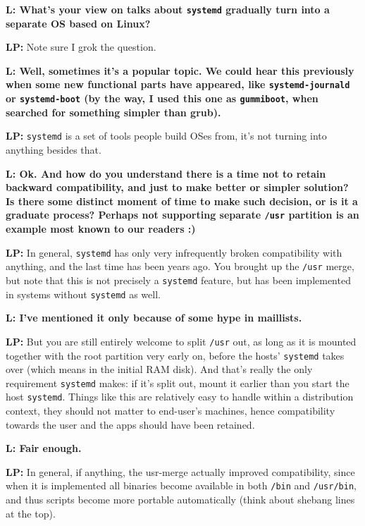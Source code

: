 \documentclass[10pt, a5paper]{article}
\begin{document}
\begin{Parallel}[p]{}{}
{{\noindent \bf L: What's your view on talks about \verb!systemd! gradually turn into a separate OS based on Linux? }

{\noindent \bf LP:}  Note sure I grok the question.

{\noindent \bf L: Well, sometimes it's a popular topic. We could hear this previously when some new functional parts have appeared, like \verb!systemd-journald! or \verb!systemd-boot! (by the way, I used this one as \verb!gummiboot!, when searched for something simpler than grub). }

{\noindent \bf LP:} \verb!systemd! is a set of tools people build OSes from, it's not turning into anything besides that.

{\noindent \bf L: Ok. And how do you understand there is a time not to retain backward compatibility, and just to make better or simpler solution? Is there some distinct moment of time to make such decision, or is it a graduate process? Perhaps not supporting separate \verb!/usr! partition is an example most known to our readers :)}

{\noindent \bf LP:} In general, \verb!systemd! has only very infrequently broken compatibility with anything, and the last time has been years ago. You brought up the \verb!/usr! merge, but note that this is not precisely a \verb!systemd! feature, but has been implemented in systems without \verb!systemd! as well. 

{\noindent \bf L: I've mentioned it only because of some hype in maillists.}

{\noindent \bf LP:} But you are still entirely welcome to split \verb!/usr! out, as long as it is mounted together with the root partition very early on, before the hosts' \verb!systemd! takes over (which means in the initial RAM disk). And that's really the only requirement \verb!systemd! makes: if it's split out, mount it earlier than you start the host \verb!systemd!. Things like this are relatively easy to handle within a distribution context, they should not matter to end-user's machines, hence compatibility towards the user and the apps should have been retained.

{\noindent \bf L: Fair enough.}

{\noindent \bf LP:} In general, if anything, the usr-merge actually improved compatibility, since when it is implemented all binaries become available in both \verb!/bin! and \verb!/usr/bin!, and thus scripts become more portable automatically (think about shebang lines at the top).

}
\end{Parallel}
\end{document}

